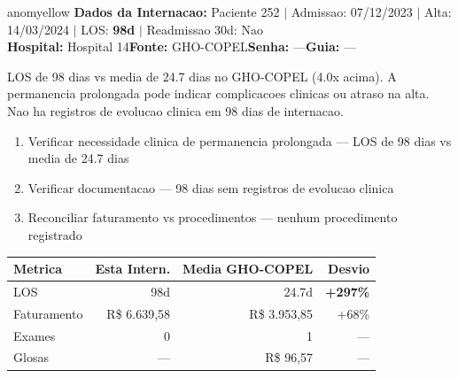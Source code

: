 \documentclass[a4paper,10pt]{article}
\begin{document}
\begin{anomalycard}[Internacao 179 | GHO-COPEL | MODERADO (z=2.02)]{anomyellow}
\textbf{Dados da Internacao:} Paciente 252 $\mid$ Admissao: 07/12/2023 $\mid$ Alta: 14/03/2024 $\mid$ LOS: \textbf{98d} $\mid$ Readmissao 30d: Nao\\
\textbf{Hospital:} Hospital 14\quad\textbf{Fonte:} GHO-COPEL\quad\textbf{Senha:} ---\quad\textbf{Guia:} ---\\
\vspace{2pt}\begin{tcolorbox}[colback=severityred!20,colframe=anomyellow,title={\textbf{Interpretacao de Negocio}},fonttitle=\bfseries\small,left=4pt,right=4pt,top=3pt,bottom=3pt]
{\small LOS de 98 dias vs media de 24.7 dias no GHO-COPEL (4.0x acima). A permanencia prolongada pode indicar complicacoes clinicas ou atraso na alta. Nao ha registros de evolucao clinica em 98 dias de internacao.}
\end{tcolorbox}
\begin{tcolorbox}[colback=severityyellow!30,colframe=anomorange,title={\textbf{Recomendacoes Especificas}},fonttitle=\bfseries\small,left=4pt,right=4pt,top=3pt,bottom=3pt]
\begin{enumerate}[nosep,leftmargin=16pt]
\item {\small Verificar necessidade clinica de permanencia prolongada --- LOS de 98 dias vs media de 24.7 dias}
\item {\small Verificar documentacao --- 98 dias sem registros de evolucao clinica}
\item {\small Reconciliar faturamento vs procedimentos --- nenhum procedimento registrado}
\end{enumerate}
\end{tcolorbox}
\begin{center}\begin{tabular}{l r r r}\toprule\textbf{Metrica} & \textbf{Esta Intern.} & \textbf{Media GHO-COPEL} & \textbf{Desvio} \\\midrule
LOS & 98d & 24.7d & \textcolor{anomred}{\textbf{+297\%}} \\
Faturamento & R\$ 6.639,58 & R\$ 3.953,85 & \textcolor{anomorange}{+68\%} \\
Exames & 0 & 1 & --- \\
Glosas & --- & R\$ 96,57 & --- \\
\bottomrule\end{tabular}\end{center}


\end{anomalycard}
\end{document}
